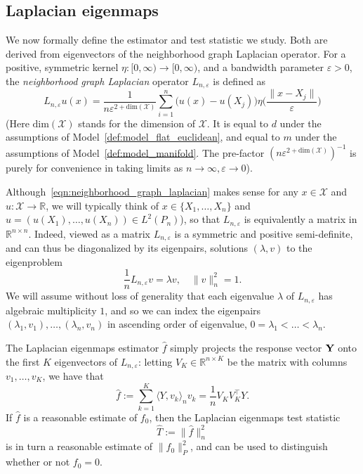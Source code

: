 \documentclass{article}
\newcommand{\Reals}{\mathbb{R}}
\newcommand{\1}{\mathbf{1}}
\newcommand{\Leb}{L}
\newcommand{\mc}[1]{\mathcal{#1}}
\newcommand{\dotp}[2]{\langle #1, #2 \rangle}
\newcommand{\wh}[1]{\widehat{#1}}
\theoremstyle{alden}
\theoremstyle{aldenthm}
\theoremstyle{definition}
\theoremstyle{remark}
\begin{document}
\subsection{Laplacian eigenmaps}
We now formally define the estimator and test statistic we study. Both are derived from eigenvectors of the neighborhood graph Laplacian operator. For a positive, symmetric kernel $\eta: [0,\infty) \to [0,\infty)$, and a bandwidth parameter $\varepsilon > 0$, the \emph{neighborhood graph Laplacian} operator $L_{n,\varepsilon}$ is defined as
\begin{equation}
\label{eqn:neighborhood_graph_laplacian}
L_{n,\varepsilon}u(x) = \frac{1}{n\varepsilon^{2 + \mathrm{dim}(\mc{X})}} \sum_{i = 1}^{n} \bigl(u(x) - u(X_j)\bigr) \eta\biggl(\frac{\|x - X_j\|}{\varepsilon}\biggr)
\end{equation}
(Here $\mathrm{dim}(\mc{X})$ stands for the dimension of $\mc{X}$. It is equal to $d$ under the assumptions of Model~\ref{def:model_flat_euclidean}, and equal to $m$ under the assumptions of Model~\ref{def:model_manifold}. The pre-factor $(n\varepsilon^{2 + \mathrm{dim}(\mc{X})})^{-1}$ is purely for convenience in taking limits as $n \to \infty, \varepsilon \to 0$). 

Although~\eqref{eqn:neighborhood_graph_laplacian} makes sense for any $x \in \mc{X}$ and $u: \mc{X} \to \Reals$, we will typically think of $x \in \{X_1,\ldots,X_n\}$ and $u = (u(X_1),\ldots,u(X_n)) \in \Leb^2(P_n)$), so that $L_{n,\varepsilon}$ is equivalently a matrix in $\Reals^{n \times n}$. Indeed, viewed as a matrix $L_{n,\varepsilon}$ is a symmetric and positive semi-definite, and can thus be diagonalized by its eigenpairs, solutions $(\lambda,v)$ to the eigenproblem
\begin{equation*}
\frac{1}{n}L_{n,\varepsilon}v = \lambda v, \quad \|v\|_n^2 = 1.
\end{equation*}
We will assume without loss of generality that each eigenvalue $\lambda$ of $L_{n,\varepsilon}$ has algebraic multiplicity $1$, and so we can index the eigenpairs $(\lambda_1,v_1),\ldots,(\lambda_n,v_n)$ in ascending order of eigenvalue, $0 = \lambda_1 < \ldots < \lambda_n$. 

The Laplacian eigenmaps estimator $\wh{f}$ simply projects the response vector ${\bf Y}$ onto the first $K$ eigenvectors of $L_{n,\varepsilon}$: letting $V_K \in \Reals^{n \times K}$ be the matrix with columns $v_1,\ldots,v_K$, we have that
\begin{equation}
\label{eqn:laplacian_eigenmaps_estimator}
\wh{f} := \sum_{k = 1}^{K} \dotp{Y}{v_k}_{n} v_k = \frac{1}{n} V_K V_K^{\top} Y.
\end{equation} 
If $\wh{f}$ is a reasonable estimate of $f_0$, then the Laplacian eigenmaps test statistic
\begin{equation}
\label{eqn:laplacian_eigenmaps_test}
\wh{T} := \|\wh{f}\|_n^2
\end{equation}
is in turn a reasonable estimate of $\|f_0\|_{P}^2$, and can be used to distinguish whether or not $f_0 = 0$.
\end{document}
